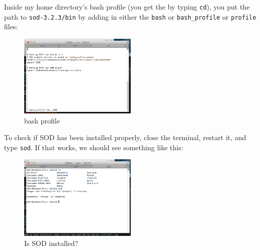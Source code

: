 \documentclass[letterpaper,10pt]{article}
\begin{document}
Inside my home directory's bash profile (you get the by typing \verb"cd"), you put the path to \verb"sod-3.2.3/bin" by adding in either the \verb"bash" or \verb"bash_profile" or \verb"profile" files: 
 
\begin{figure}[h!]
  \centering
  \includegraphics[width=0.5\textwidth]{images/home_bash_profile}
  \caption{bash profile}
  \label{fig:home_bash_profile}
\end{figure}

To check if SOD has been installed properly, close the terminal, restart it, and type \verb"sod". If that works, we should see something like this: 

\begin{figure}[h!]
  \centering
  \includegraphics[width=0.5\textwidth]{images/sod_installed_query}
  \caption{Is SOD installed?}
  \label{fig:sod_installed_query}
\end{figure}


\end{document}
